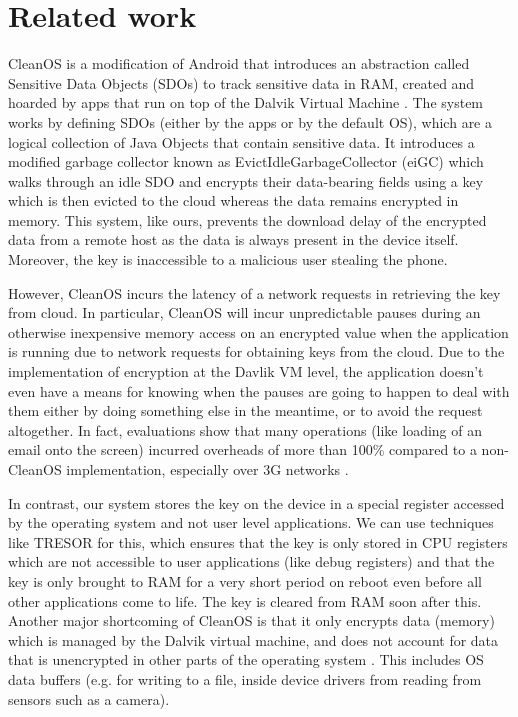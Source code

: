 \documentclass[conference,10pt]{IEEEtran}
\begin{document}

\section{Related work}
CleanOS is a modification of Android that introduces an abstraction called Sensitive Data Objects (SDOs) to 
track sensitive data in RAM, created and hoarded by apps that run on top of the Dalvik Virtual Machine 
\cite{cleanos}. The system works by defining SDOs (either by the apps or by the default OS), which are a 
logical collection of Java Objects that contain sensitive data. It introduces a modified garbage collector 
known as EvictIdleGarbageCollector (eiGC) which walks through an idle SDO and encrypts their data-bearing 
fields using a key which is then evicted to the cloud whereas the data remains encrypted in memory.  This 
system, like ours, prevents the download delay of the encrypted data from a remote host as the data is 
always present in the device itself. Moreover, the key is inaccessible to a malicious user stealing the 
phone.

However, CleanOS incurs the latency of a network requests in retrieving the key from cloud.  In particular, 
CleanOS will incur unpredictable pauses during an otherwise inexpensive memory access on an encrypted value 
when the application is running due to network requests for obtaining keys from the cloud. Due to the 
implementation of encryption at the Davlik VM level, the application doesn't even have a means for knowing 
when the pauses are going to happen to deal with them either by doing something else in the meantime, or to 
avoid the request altogether.  In fact, evaluations show that many operations (like loading of an email 
onto the screen) incurred overheads of more than 100\% compared to a non-CleanOS implementation, especially 
over 3G networks \cite{cleanos}.

In contrast, our system stores the key on the device in a special register accessed by the operating system 
and not user level applications. We can use techniques like TRESOR \cite{tresor} for this, which ensures 
that the key is only stored in CPU registers which are not accessible to user applications (like debug 
registers) and that the key is only brought to RAM for a very short period on reboot even before all other 
applications come to life. The key is cleared from RAM soon after this.  Another major shortcoming of 
CleanOS is that it only encrypts data (memory) which is managed by the Dalvik virtual machine, and does not 
account for data that is unencrypted in other parts of the operating system \cite{cleanos}.  This includes 
OS data buffers (e.g. for writing to a file, inside device drivers from reading from sensors such as a 
camera).
\end{document}
